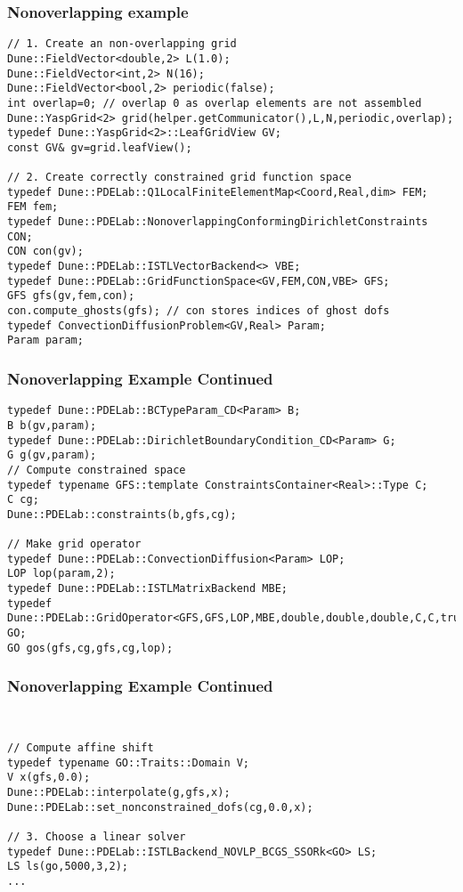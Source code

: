 \begin{frame}[fragile]
  \frametitle{Nonoverlapping example}
  \begin{lstlisting}
// 1. Create an non-overlapping grid
Dune::FieldVector<double,2> L(1.0);
Dune::FieldVector<int,2> N(16);
Dune::FieldVector<bool,2> periodic(false);
int overlap=0; // overlap 0 as overlap elements are not assembled
Dune::YaspGrid<2> grid(helper.getCommunicator(),L,N,periodic,overlap);
typedef Dune::YaspGrid<2>::LeafGridView GV;
const GV& gv=grid.leafView();

// 2. Create correctly constrained grid function space
typedef Dune::PDELab::Q1LocalFiniteElementMap<Coord,Real,dim> FEM;
FEM fem;
typedef Dune::PDELab::NonoverlappingConformingDirichletConstraints CON;
CON con(gv);
typedef Dune::PDELab::ISTLVectorBackend<> VBE;
typedef Dune::PDELab::GridFunctionSpace<GV,FEM,CON,VBE> GFS;
GFS gfs(gv,fem,con);
con.compute_ghosts(gfs); // con stores indices of ghost dofs
typedef ConvectionDiffusionProblem<GV,Real> Param;
Param param;
\end{lstlisting}
\end{frame}
\begin{frame}[fragile]
\frametitle<presentation>{Nonoverlapping Example Continued}
  \begin{lstlisting}
typedef Dune::PDELab::BCTypeParam_CD<Param> B;
B b(gv,param);
typedef Dune::PDELab::DirichletBoundaryCondition_CD<Param> G;
G g(gv,param);
// Compute constrained space
typedef typename GFS::template ConstraintsContainer<Real>::Type C;
C cg;
Dune::PDELab::constraints(b,gfs,cg);

// Make grid operator
typedef Dune::PDELab::ConvectionDiffusion<Param> LOP;
LOP lop(param,2);
typedef Dune::PDELab::ISTLMatrixBackend MBE;
typedef Dune::PDELab::GridOperator<GFS,GFS,LOP,MBE,double,double,double,C,C,true> GO;
GO gos(gfs,cg,gfs,cg,lop);

\end{lstlisting}
\end{frame}
\begin{frame}[fragile]
\frametitle<presentation>{Nonoverlapping Example Continued}
  \begin{lstlisting}


// Compute affine shift
typedef typename GO::Traits::Domain V;
V x(gfs,0.0);
Dune::PDELab::interpolate(g,gfs,x);
Dune::PDELab::set_nonconstrained_dofs(cg,0.0,x);

// 3. Choose a linear solver
typedef Dune::PDELab::ISTLBackend_NOVLP_BCGS_SSORk<GO> LS;
LS ls(go,5000,3,2);
...
\end{lstlisting}

\end{frame}
